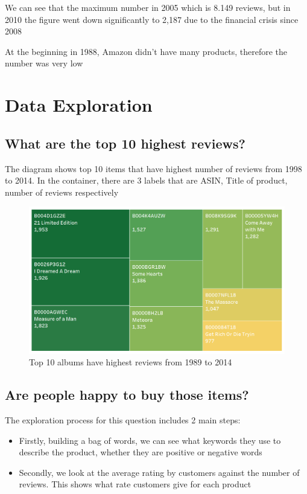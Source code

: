 \documentclass[a4paper,11pt]{article}
\begin{document}
		We can see that the maximum number in 2005 which is 8.149 reviews, but in 2010 the figure went down significantly to 2,187 due to the financial crisis since 2008
		
		At the beginning in 1988, Amazon didn’t have many products, therefore the number was very low

	
\section{Data Exploration}
	\subsection{What are the top 10 highest reviews?}
	The diagram shows top 10 items that have highest number of reviews from 1998 to 2014. In the container, there are 3 labels that are ASIN, Title of product, number of reviews respectively
	\begin{figure}[H]
			\includegraphics[width=1\textwidth, center]{pic8}
			\caption{Top 10 albums have highest reviews from 1989 to 2014}
	\end{figure}	
	
	
	\subsection{Are people happy to buy those items?}
		The exploration process for this question includes 2 main steps:
		\begin{itemize}
			\item Firstly, building a bag of words, we can see what keywords they use to describe the product, whether they are positive or negative words
			\item Secondly, we look at the average rating by customers against the number of reviews. This shows what rate customers give for each product
		\end{itemize}
	
\end{document}
